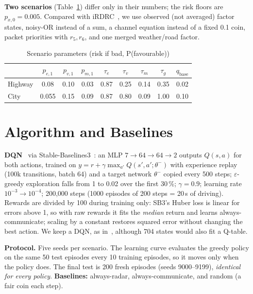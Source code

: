 \documentclass[10pt,conference]{IEEEtran}
\begin{document}
\textbf{Two scenarios} (Table~\ref{tab:scen}) differ only in their numbers; the
risk floors are $p_{x,0}=0.005$. Compared with iRDRC~\cite{hieu2020irdrc}, we
use observed (not averaged) factor states, noisy-OR instead of a sum, a channel
equation instead of a fixed 0.1 coin, packet priorities with $r_5,r_6$, and one
merged weather/road factor.

\begin{table}[t]
\caption{Scenario parameters (risk if bad, P(favourable))}
\label{tab:scen}
\centering\footnotesize
\setlength{\tabcolsep}{3.2pt}
\begin{tabular}{lcccccccc}
\toprule
 & $p_{e,1}$ & $p_{v,1}$ & $p_{m,1}$ & $\tau_e$ & $\tau_v$ & $\tau_m$ & $\tau_g$ & $q_{\text{base}}$\\
\midrule
Highway & 0.08 & 0.10 & 0.03 & 0.87 & 0.25 & 0.14 & 0.35 & 0.02\\
City    & 0.055 & 0.15 & 0.09 & 0.87 & 0.80 & 0.09 & 1.00 & 0.10\\
\bottomrule
\end{tabular}
\end{table}

\section{Algorithm and Baselines}
\textbf{DQN}~\cite{mnih2015dqn} via Stable-Baselines3~\cite{raffin2021sb3}:
an MLP $7\!\to\!64\!\to\!64\!\to\!2$ outputs $Q(s,a)$ for both actions, trained
on $y=r+\gamma\max_{a'}Q(s',a';\theta^-)$ with experience replay (100k
transitions, batch 64) and a target network $\theta^-$ copied every 500 steps;
$\varepsilon$-greedy exploration falls from 1 to 0.02 over the first 30\,\%;
$\gamma=0.9$; learning rate $10^{-3}\!\to\!10^{-4}$; 200{,}000 steps (1000
episodes of 200 steps = 20\,s of driving). Rewards are divided by 100 during
training only: SB3's Huber loss is linear for errors above 1, so with raw
rewards it fits the \emph{median} return and learns always-communicate;
scaling by a constant restores squared error without changing the best action.
We keep a DQN, as in~\cite{hieu2020irdrc}, although 704 states would also fit a
Q-table.

\textbf{Protocol.} Five seeds per scenario. The learning curve evaluates the
greedy policy on the same 50 test episodes every 10 training episodes, so it
moves only when the policy does. The final test is 200 fresh episodes (seeds
9000--9199), \emph{identical for every policy}. \textbf{Baselines:}
always-radar, always-communicate, and random (a fair coin each step).
\end{document}
